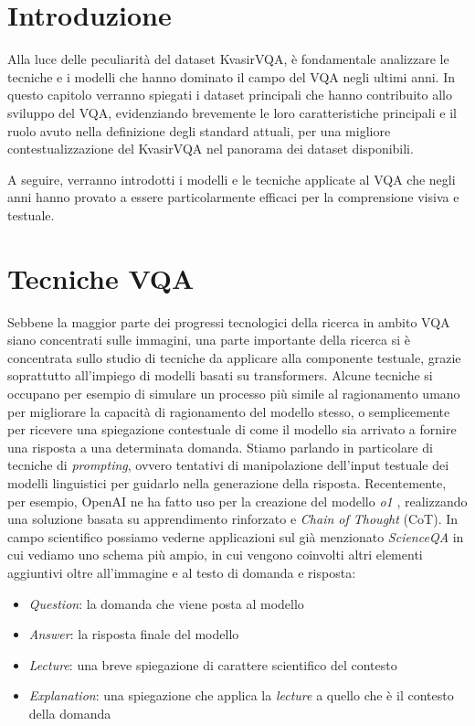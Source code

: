 \documentclass[../main.tex]{subfiles}
\begin{document}
\section{Introduzione}

Alla luce delle peculiarità del dataset KvasirVQA, è fondamentale analizzare le tecniche e i modelli che hanno dominato il campo del VQA negli ultimi anni. 
In questo capitolo verranno spiegati i dataset principali che hanno contribuito allo sviluppo del VQA, evidenziando brevemente le loro caratteristiche principali e il ruolo avuto nella definizione degli standard attuali, per una migliore contestualizzazione del KvasirVQA nel panorama dei dataset disponibili.

A seguire, verranno introdotti i modelli e le tecniche applicate al VQA che negli anni hanno provato a essere particolarmente efficaci per la comprensione visiva e testuale.

\section{Tecniche VQA}

Sebbene la maggior parte dei progressi tecnologici della ricerca in ambito VQA siano concentrati sulle immagini, una parte importante della ricerca si è concentrata sullo studio di tecniche da applicare alla componente testuale, grazie soprattutto all'impiego di modelli basati su transformers. 
Alcune tecniche si occupano per esempio di simulare un processo più simile al ragionamento umano per migliorare la capacità di ragionamento del modello stesso, o semplicemente per ricevere una spiegazione contestuale di come il modello sia arrivato a fornire una risposta a una determinata domanda.
Stiamo parlando in particolare di tecniche di \textit{prompting}, ovvero tentativi di manipolazione dell'input testuale dei modelli linguistici per guidarlo nella generazione della risposta.
Recentemente, per esempio, OpenAI ne ha fatto uso per la creazione del modello \textit{o1} \cite{jaech2024openai}, realizzando una soluzione basata su apprendimento rinforzato e \textit{Chain of Thought} (CoT).
In campo scientifico possiamo vederne applicazioni sul già menzionato \textit{ScienceQA} in cui vediamo uno schema più ampio, in cui vengono coinvolti altri elementi aggiuntivi oltre all'immagine e al testo di domanda e risposta:

\begin{itemize}
    \item \textit{Question}: la domanda che viene posta al modello
    \item \textit{Answer}: la risposta finale del modello
    \item \textit{Lecture}: una breve spiegazione di carattere scientifico del contesto
    \item \textit{Explanation}: una spiegazione che applica la \textit{lecture} a quello che è il contesto della domanda
\end{itemize}
\end{document}
